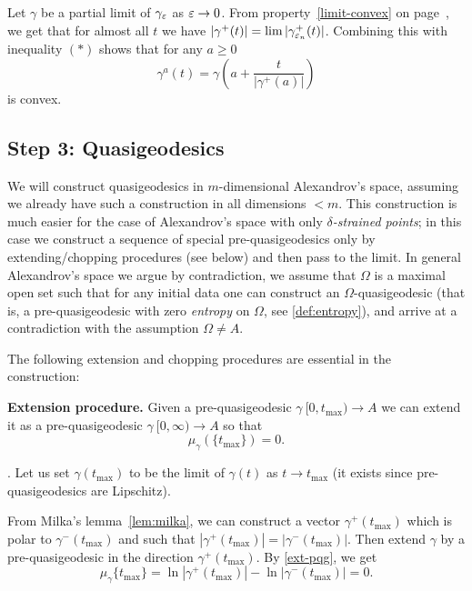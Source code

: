 \documentclass{article}
\begin{document}
Let $\gamma$ be a partial limit of $\gamma_{\varepsilon}$ as $\varepsilon\to0$.
From property~\ref{limit-convex} on page~\pageref{limit-convex}, we get that for
almost all $t$ we have $|\gamma^+(t)|=\lim|\gamma_{\varepsilon_n}^+(t)|$.
Combining this with inequality $(*)$ shows that for any $a\ge0$
$$\gamma^{a}(t)=\gamma\left({a}+\frac{t}{|\gamma^+({a})|}\right)$$
is convex.
\qeds






\subsection{Step 3: Quasigeodesics}\label{step3}


We will construct quasigeodesics in $m$-dimensional Alexandrov's space, assuming
we already have such a construction in all dimensions $<m$. 
This construction is much easier for the case of Alexandrov's space with only
\textit{$\delta$-strained points}; in this case we construct a sequence of special pre-quasigeodesics only by
extending/chopping procedures (see below) and then pass to the limit.
In general Alexandrov's space we argue by contradiction, we assume that $\Omega$ is a maximal
open set such that for any initial data one can construct an
$\Omega$-quasigeodesic 
(that is, a pre-quasigeodesic with zero {\it entropy} on
$\Omega$, see \ref{def:entropy}), 
and arrive at a contradiction with the assumption
$\Omega\not=A$.





The following extension and chopping procedures are essential in the construction:

\begin{thm}{\bf Extension procedure.}\label{extension} Given a pre-quasigeodesic
$\gamma\:[0,t_{\max})\to A$ we can extend it as a pre-quasigeodesic
$\gamma\:[0,\infty)\to A$ so that 
$$\mu_\gamma(\{t_{\max}\})=0.$$
\end{thm}
\Proof. 
Let us set $\gamma(t_{\max})$ to be the limit of $\gamma(t)$ as $t\to t_{\max}$
(it exists since pre-quasigeodesics are Lipschitz).

From Milka's lemma~\ref{lem:milka}, we can construct a vector 
$\gamma^+(t_{\max})$ which is polar to $\gamma^-(t_{\max})$
and such that
$|\gamma^+(t_{\max})|=|\gamma^-(t_{\max})|$.
Then extend $\gamma$ by a pre-quasigeodesic in the direction $\gamma^+(t_{\max})$. 
By \ref{ext-pqg}, we get
$$\mu_\gamma\{t_{\max}\}=\ln|\gamma^+(t_{\max})|-\ln|\gamma^-(t_{\max}
)|=0.$$
\qedsf
\end{document}
